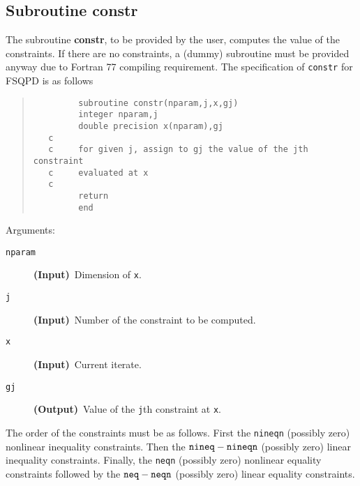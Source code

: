 \subsection{Subroutine constr}
\label{subconstr}
The subroutine {\bf constr}, to be provided by the user, 
computes the value of 
the constraints. If there are no constraints, 
a (dummy) subroutine must be
provided anyway due to Fortran 77 compiling requirement.
The specification of {\tt constr} for FSQPD is as follows
\begin{quote}
\begin{verbatim}
         subroutine constr(nparam,j,x,gj)
         integer nparam,j
         double precision x(nparam),gj
   c
   c     for given j, assign to gj the value of the jth constraint 
   c     evaluated at x
   c
         return
         end
\end{verbatim}
\end{quote}
\noindent Arguments:
\begin{description}
\item[\tt nparam]  {\bf (Input)}~Dimension of {\tt x}.
\item[\tt j]    {\bf (Input)}~Number of the constraint to be computed. 
\item[\tt x]    {\bf (Input)}~Current iterate.
\item[\tt gj]   {\bf (Output)}~Value of the {\tt j}th constraint at {\tt x}.
\end{description}
\bigskip
The order of the constraints must be as follows. 
First the {\tt nineqn} (possibly zero) nonlinear inequality constraints. 
Then the ${\tt nineq-nineqn}$ (possibly zero) linear inequality constraints. 
Finally, the {\tt neqn} (possibly zero) nonlinear equality constraints
followed by the ${\tt neq-neqn}$ (possibly zero) linear equality constraints.

